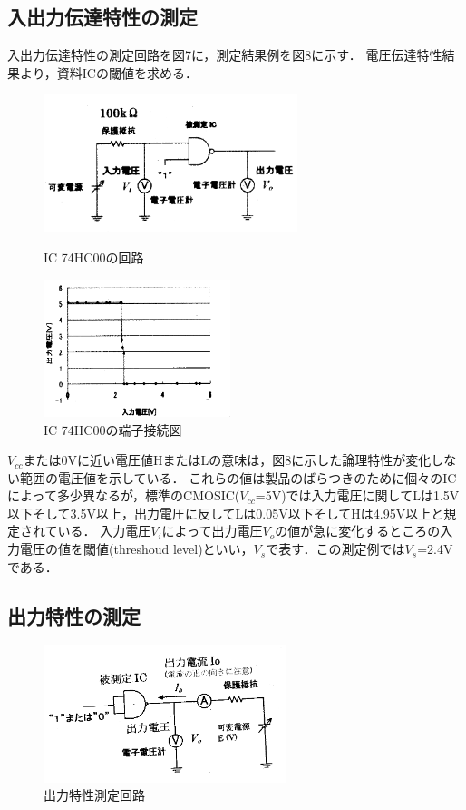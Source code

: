 \documentclass[10pt, a4j, dvipdfmx]{jarticle}
\begin{document}
\subsection{入出力伝達特性の測定}
入出力伝達特性の測定回路を図7に，測定結果例を図8に示す．
電圧伝達特性結果より，資料ICの閾値を求める．
\begin{figure}[H]
  \begin{minipage}{0.5\hsize}
    \centering
    \includegraphics[height=40mm]{実験テキスト/図7.png}
    \caption{IC 74HC00の回路}
  \end{minipage}
  \begin{minipage}{0.5\hsize}
    \centering
    \includegraphics[height=40mm]{実験テキスト/図8.png}
    \caption{IC 74HC00の端子接続図}
  \end{minipage}
\end{figure}
$V_{cc}$または0Vに近い電圧値HまたはLの意味は，図8に示した論理特性が変化しない範囲の電圧値を示している．
これらの値は製品のばらつきのために個々のICによって多少異なるが，標準のCMOSIC($V_{cc}$=5V)では入力電圧に関してLは1.5V以下そして3.5V以上，出力電圧に反してLは0.05V以下そしてHは4.95V以上と規定されている．
入力電圧$V_i$によって出力電圧$V_o$の値が急に変化するところの入力電圧の値を閾値(threshoud level)といい，$V_s$で表す．この測定例では$V_s$=2.4Vである．

\subsection{出力特性の測定}
\begin{figure}
 \vspace*{-\intextsep}
 \begin{center}
  \includegraphics[height=40mm,  angle=-2]{実験テキスト/図9.png}
  \caption{出力特性測定回路}
 \end{center}
\end{figure}
\end{document}
